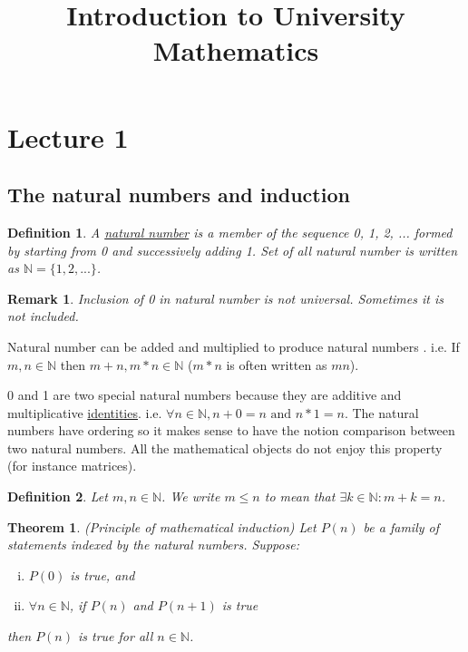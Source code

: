 \documentclass{article}
\title{Introduction to University Mathematics}
\author{}
\date{}
\newtheorem{definition}{Definition}
\newtheorem{theorem}{Theorem}
\newtheorem{remark}{Remark}
\begin{document}
\maketitle
\tableofcontents
\newpage

\section{Lecture 1}
\subsection{The natural numbers and induction}

\begin{definition}
  \normalfont
  A \underline{natural number} is a member of the sequence 0, 1, 2, ... formed by starting from 0 and successively adding 1. Set of all natural number is written as $\mathbb{N} = \{1,2,...\}$.
\end{definition}

\begin{remark}
  Inclusion of 0 in natural number is not universal. Sometimes it is not included.
\end{remark}

Natural number can be added and multiplied to produce natural numbers . i.e. If $m,n\in\mathbb{N}$ then $m+n,m*n\in\mathbb{N}$ ($m*n$ is often written as $mn$). 

0 and 1 are two special natural numbers because they are additive and multiplicative \underline{identities}. i.e. $\forall n\in\mathbb{N}, n + 0 = n \text{ and } n * 1 = n$. The natural numbers have ordering so it makes sense to have the notion comparison between two natural numbers. All the mathematical objects do not enjoy this property (for instance matrices).

\begin{definition}
  \normalfont
  Let $m, n \in\mathbb{N}$. We write $m\leq n$ to mean that $\exists k \in \mathbb{N}:m+k = n$.
\end{definition}

\begin{theorem}
  \normalfont
  (Principle of mathematical induction) Let $P(n)$ be a family of statements indexed by the natural numbers. Suppose:
  \begin{enumerate}[i.]
    \item $P(0)$ is true, and
    \item $\forall n\in\mathbb{N}$, if $P(n)$ and $P(n+1)$ is true
  \end{enumerate}
  then $P(n)$ is true for all $n\in\mathbb{N}$.
\end{theorem}
\end{document}
